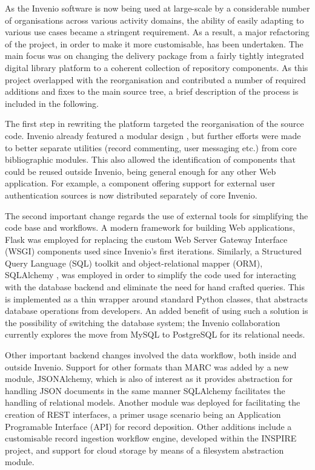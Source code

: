 
As the Invenio software is now being used at large-scale by a considerable
number of organisations across various activity domains, the ability of easily
adapting to various use cases became a stringent requirement. As a result, a
major refactoring of the project, in order to make it more customisable, has
been undertaken. The main focus was on changing the delivery package from a
fairly tightly integrated digital library platform to a coherent collection of
repository components. As this project overlapped with the reorganisation and
contributed a number of required additions and fixes to the main source tree, a
brief description of the process is included in the following.

The first step in rewriting the platform targeted the reorganisation of the
source code. Invenio already featured a modular design \cite{ref:lemeur}, but
further efforts were made to better separate utilities (record commenting, user
messaging etc.) from core bibliographic modules. This also allowed the
identification of components that could be reused outside Invenio, being
general enough for any other Web application. For example, a component offering
support for external user authentication sources is now distributed separately
of core Invenio.

The second important change regards the use of external tools for simplifying
the code base and workflows. A modern framework for building Web applications,
Flask \cite{ref:flask} was employed for replacing the custom Web Server Gateway
Interface (WSGI) components used since Invenio's first iterations. Similarly, a
Structured Query Language (SQL) toolkit and object-relational mapper (ORM),
SQLAlchemy \cite{ref:sqlalchemy}, was employed in order to simplify the code
used for interacting with the database backend and eliminate the need for hand
crafted queries. This is implemented as a thin wrapper around standard Python
classes, that abstracts database operations from developers. An added benefit
of using such a solution is the possibility of switching the database system;
the Invenio collaboration currently explores the move from MySQL to PostgreSQL
for its relational needs.

Other important backend changes involved the data workflow, both inside and
outside Invenio. Support for other formats than MARC was added by a new module,
JSONAlchemy, which is also of interest as it provides abstraction for handling
JSON documents in the same manner SQLAlchemy facilitates the handling of
relational models. Another module was deployed for facilitating the creation of
REST interfaces, a primer usage scenario being an Application Programable
Interface (API) for record deposition.  Other additions include a customisable
record ingestion workflow engine, developed within the INSPIRE project, and
support for cloud storage by means of a filesystem abstraction module.

